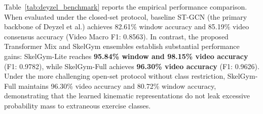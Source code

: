\documentclass[runningheads]{llncs}
\begin{document}
Table~\ref{tab:deyzel_benchmark} reports the empirical performance comparison. When evaluated under the closed-set protocol, baseline ST-GCN \cite{yan2018} (the primary backbone of Deyzel et al.) achieves 82.61\% window accuracy and 85.19\% video consensus accuracy (Video Macro F1: 0.8563). In contrast, the proposed Transformer Mix and SkelGym ensembles establish substantial performance gains: SkelGym-Lite reaches \textbf{95.84\% window and 98.15\% video accuracy} (F1: 0.9782), while SkelGym-Full achieves \textbf{96.30\% video accuracy} (F1: 0.9626). Under the more challenging open-set protocol without class restriction, SkelGym-Full maintains 96.30\% video accuracy and 80.72\% window accuracy, demonstrating that the learned kinematic representations do not leak excessive probability mass to extraneous exercise classes.

\begin{table}[!t]
\centering
\caption{Comparative evaluation across the four overlapping Strength \& Conditioning (S\&C) exercises inspired by Deyzel et al. \cite{deyzel2023} (\textit{squat}, \textit{deadlift}, \textit{barbell biceps curl}, \textit{lateral raise}) over 54 held-out test videos ($N=529$ windows).}
\label{tab:deyzel_benchmark}
\end{table}
\end{document}
